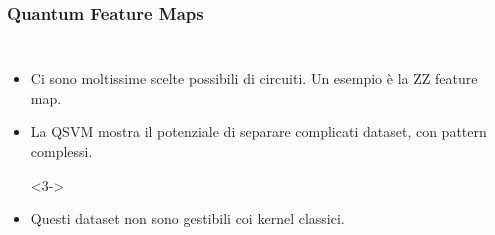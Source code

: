 \documentclass{beamer}
\begin{document}
\begin{frame}
  \frametitle{Quantum Feature Maps}

  \begin{columns}
  
    \begin{itemize}
      \item<1-> Ci sono moltissime scelte possibili di circuiti. Un esempio è la ZZ feature map.
          \item<2-> La QSVM mostra il potenziale di separare complicati dataset, con pattern complessi.  
          \item[]<3->  
          \item<4-> Questi dataset non sono gestibili coi kernel classici. 
          
          \end{itemize}
    

\end{columns}
\end{frame}
\end{document}
